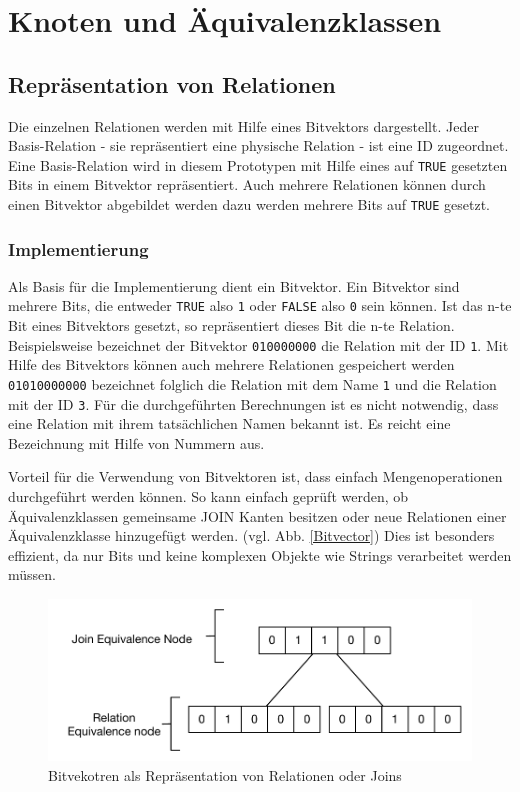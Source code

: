 \section{Knoten und Äquivalenzklassen}

\subsection{Repräsentation von Relationen}
\label{sec:Bitvector}

Die einzelnen Relationen werden mit Hilfe eines Bitvektors dargestellt. Jeder Basis-Relation - sie repräsentiert eine physische Relation - ist eine ID zugeordnet. Eine Basis-Relation wird in diesem Prototypen mit Hilfe eines auf \texttt{TRUE} gesetzten Bits in einem Bitvektor repräsentiert. Auch mehrere Relationen können durch einen Bitvektor abgebildet werden dazu werden mehrere Bits auf \texttt{TRUE} gesetzt.

\subsubsection{Implementierung}

Als Basis für die Implementierung dient ein Bitvektor. Ein Bitvektor sind mehrere Bits, die entweder \texttt{TRUE} also \texttt{1} oder \texttt{FALSE} also \texttt{0} sein können. Ist das n-te Bit eines Bitvektors gesetzt, so repräsentiert dieses Bit die n-te Relation. Beispielsweise bezeichnet der Bitvektor \texttt{010000000} die Relation mit der ID \texttt{1}. Mit Hilfe des Bitvektors können auch mehrere Relationen gespeichert werden \texttt{01010000000} bezeichnet folglich die Relation mit dem Name \texttt{1} und die Relation mit der ID \texttt{3}. Für die durchgeführten Berechnungen ist es nicht notwendig, dass eine Relation mit ihrem tatsächlichen Namen bekannt ist. Es reicht eine Bezeichnung mit Hilfe von Nummern aus.

Vorteil für die Verwendung von Bitvektoren ist, dass einfach Mengenoperationen durchgeführt werden können. So kann einfach geprüft werden, ob Äquivalenzklassen gemeinsame JOIN Kanten besitzen oder neue Relationen einer Äquivalenzklasse hinzugefügt werden. (vgl. Abb. \ref{Bitvector}) Dies ist besonders effizient, da nur Bits und keine komplexen Objekte wie Strings verarbeitet werden müssen.



\begin{figure}[ht]
  \centering
  \includegraphics{04_Implementierung/Bitvector.pdf}
  \caption{Bitvekotren als Repräsentation von Relationen oder Joins}
  \label{Bitvektor}
\end{figure}


